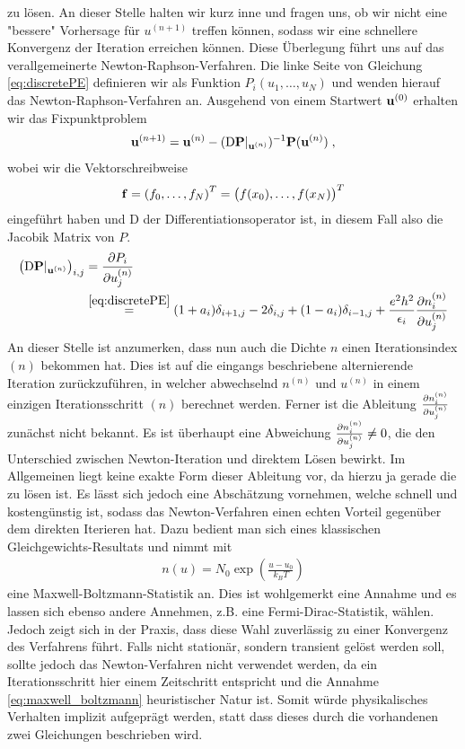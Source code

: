 zu lösen. An dieser Stelle halten wir kurz inne und fragen uns, ob wir nicht eine "bessere" Vorhersage für $u^{(n+1)}$ treffen können, sodass wir eine schnellere Konvergenz der Iteration erreichen können. Diese Überlegung führt uns auf das verallgemeinerte Newton-Raphson-Verfahren.
Die linke Seite von Gleichung \eqref{eq:discretePE} definieren wir als Funktion $P_i(u_1,\dots,u_N)$ und wenden hierauf das Newton-Raphson-Verfahren an. Ausgehend von einem Startwert $\vb{u}^{(0)}$ erhalten wir das Fixpunktproblem
\begin{align}
  \vb{u}^{(n+1)} = \vb{u}^{(n)} - (\mathrm{D}\vb{P}|_{\vb{u}^{(n)}})^{-1} \vb{P}(\vb{u}^{(n)}) \; ,
  \label{eq:fixpunkt_gummel}
\end{align}
wobei wir die Vektorschreibweise
\begin{align}
  \vb{f} = \left( f_0,\dots,f_N\right)^T = \left( f(x_0),\dots,f(x_N)\right)^T
\end{align}
eingeführt haben und $\mathrm{D}$ der Differentiationsoperator ist, in diesem Fall also die Jacobik Matrix von $P$.
\begin{align}
  \left(\mathrm{D}\vb{P}|_{\vb{u}^{(n)}}\right)_{i,j} &= \frac{\mathrm{\partial}P_i}{\mathrm{\partial}u_j^{(n)}} \\ &\stackrel{\eqref{eq:discretePE}}{=}
  (1+a_i)\delta_{i+1,j} - 2 \delta_{i,j} + (1-a_i)\delta_{i-1,j} + \frac{e^2h^2}{\epsilon_i}\frac{\mathrm{\partial}n_i^{(n)}}{\mathrm{\partial}u_j^{(n)}}
\end{align}
An dieser Stelle ist anzumerken, dass nun auch die Dichte $n$ einen Iterationsindex $(n)$ bekommen hat. Dies ist auf die eingangs beschriebene alternierende Iteration zurückzuführen, in welcher abwechselnd $n^{(n)}$ und $u^{(n)}$ in einem einzigen Iterationsschritt $(n)$ berechnet werden. Ferner ist die Ableitung $\frac{\mathrm{\partial}n_i^{(n)}}{\mathrm{\partial}u_j^{(n)}}$ zunächst nicht bekannt.
Es ist überhaupt eine Abweichung $\frac{\mathrm{\partial}n_i^{(n)}}{\mathrm{\partial}u_j^{(n)}} \neq 0$, die den Unterschied zwischen Newton-Iteration und direktem Lösen bewirkt. Im Allgemeinen liegt keine exakte Form dieser Ableitung vor, da hierzu ja gerade die \lvn zu lösen ist. Es lässt sich jedoch eine Abschätzung vornehmen, welche schnell und kostengünstig ist, sodass das Newton-Verfahren einen echten Vorteil gegenüber dem direkten Iterieren hat. Dazu bedient man sich eines klassischen Gleichgewichts-Resultats und nimmt mit
\begin{align}
  n(u) = N_0\exp\left(\frac{u-u_0}{k_B T}\right)
  \label{eq:maxwell_boltzmann}
\end{align}
eine Maxwell-Boltzmann-Statistik an. Dies ist wohlgemerkt eine Annahme und es lassen sich ebenso andere Annehmen, z.B. eine Fermi-Dirac-Statistik, wählen. Jedoch zeigt sich in der Praxis, dass diese Wahl zuverlässig zu einer Konvergenz des Verfahrens führt. Falls nicht stationär, sondern transient gelöst werden soll, sollte jedoch das Newton-Verfahren nicht verwendet werden, da ein Iterationsschritt hier einem Zeitschritt entspricht und die Annahme \eqref{eq:maxwell_boltzmann} heuristischer Natur ist. Somit würde physikalisches Verhalten implizit aufgeprägt werden, statt dass dieses durch die vorhandenen zwei Gleichungen beschrieben wird.

